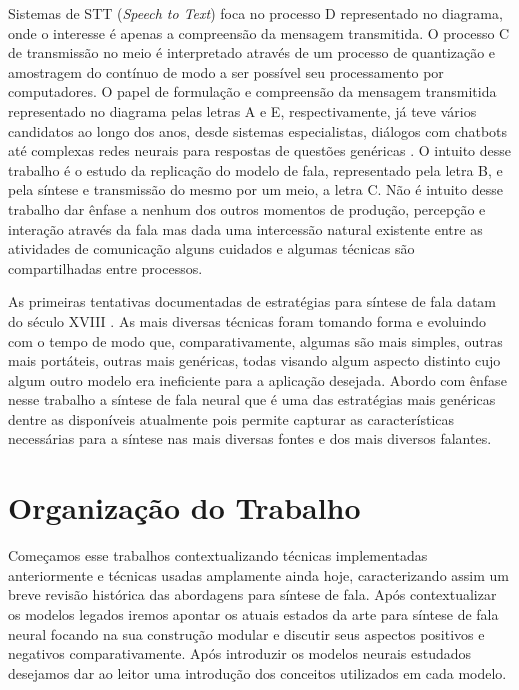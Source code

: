 Sistemas de STT (\textit{Speech to Text}) foca no processo D representado no diagrama, onde o interesse é apenas a compreensão da mensagem transmitida. O processo C de transmissão no meio é interpretado através de um processo de quantização e amostragem do contínuo de modo a ser possível seu processamento por computadores. O papel de formulação e compreensão da mensagem transmitida representado no diagrama pelas letras A e E, respectivamente, já teve vários candidatos ao longo dos anos, desde sistemas especialistas, diálogos com chatbots até complexas redes neurais para respostas de questões genéricas \cite{question_1:DBLP:journals/corr/abs-1805-08092, question_2:DBLP:journals/corr/abs-1806-08730, pointer_1:DBLP:journals/corr/XiongZS16, pointer_2:DBLP:journals/corr/abs-1801-08290, pointer_3:DBLP:journals/corr/abs-1801-09251, pointer_4:DBLP:journals/corr/WangJ16a}. O intuito desse trabalho é o estudo da replicação do modelo de fala, representado pela letra B, e pela síntese e transmissão do mesmo por um meio, a letra C. Não é intuito desse trabalho dar ênfase a nenhum dos outros momentos de produção, percepção e interação através da fala mas dada uma intercessão natural existente entre as atividades de comunicação alguns cuidados e algumas técnicas são compartilhadas entre processos.

As primeiras tentativas documentadas de estratégias para síntese de fala datam do século XVIII \cite{vonKempelen1791}. As mais diversas técnicas foram tomando forma e evoluindo com o tempo de modo que, comparativamente, algumas são mais simples, outras mais portáteis, outras mais genéricas, todas visando algum aspecto distinto cujo algum outro modelo era ineficiente para a aplicação desejada. Abordo com ênfase nesse trabalho a síntese de fala neural que é uma das estratégias mais genéricas dentre as disponíveis atualmente pois permite capturar as características necessárias para a síntese nas mais diversas fontes e dos mais diversos falantes.

\section{Organização do Trabalho}
\label{sec:organizacao_trabalho}

Começamos esse trabalhos contextualizando técnicas implementadas anteriormente e técnicas usadas amplamente ainda hoje, caracterizando assim um breve revisão histórica das abordagens para síntese de fala. Após contextualizar os modelos legados iremos apontar os atuais estados da arte para síntese de fala neural focando na sua construção modular e discutir seus aspectos positivos e negativos comparativamente. Após introduzir os modelos neurais estudados desejamos dar ao leitor uma introdução dos conceitos utilizados em cada modelo. 

